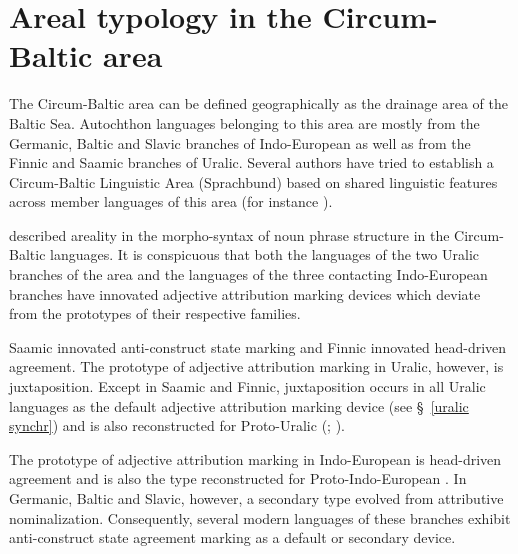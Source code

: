 
\chapter{Areal typology in the Circum-Baltic area}\label{circumbaltic}
The Circum-Baltic area can be defined geographically as the drainage area of the Baltic Sea. Autochthon languages belonging to this area are mostly from the Germanic, Baltic and Slavic branches of Indo-European as well as from the Finnic and Saamic branches of Uralic. Several authors have tried to establish a Circum-Baltic Linguistic Area (Sprachbund) based on shared linguistic features across member languages of this area (for instance \citealt{koptjevskaja-tamm2006}).

\cite{riesler2006a} described areality in the morpho-syntax of noun phrase structure in the Circum-Baltic languages. It is conspicuous that both the languages of the two Uralic branches of the area and the languages of the three contacting Indo-European branches have innovated adjective attribution marking devices which deviate from the prototypes of their respective families.

Saamic innovated anti-construct state marking and Finnic innovated head\hyp{}driven agreement. The prototype of adjective attribution marking in Uralic, however, is juxtaposition. Except in Saamic and Finnic, juxtaposition occurs in all Uralic languages as the default adjective attribution marking device (see \S~\ref{uralic synchr}) and is also reconstructed for Proto\hyp{}Uralic (\citealt[66, 81]{decsy1990}; \citealt[32]{janhunen1981}).

The prototype of adjective attribution marking in Indo-European is head\hyp{}driven agreement and is also the type reconstructed for Proto\hyp{}Indo-European \citep{decsy1991,watkins1998}. In Germanic, Baltic and Slavic, however, a secondary type evolved from attributive nominalization. Consequently, several modern languages of these branches exhibit anti-construct state agreement marking as a default or secondary device.

